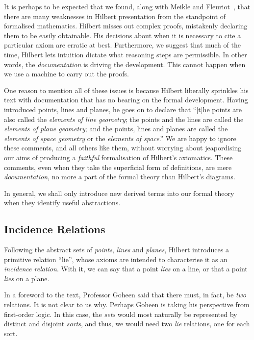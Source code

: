 It is perhaps to be expected that we found, along with Meikle and Fleuriot~\cite{MeikleFleuriotFormalizingHilbert}, that there are many weaknesses in Hilbert presentation from the standpoint of formalised mathematics. Hilbert misses out complex proofs, mistakenly declaring them to be easily obtainable. His decisions about when it is necessary to cite a particular axiom are erratic at best. Furthermore, we suggest that much of the time, Hilbert lets intuition dictate what reasoning steps are permissible. In other words, the \emph{documentation} is driving the development. This cannot happen when we use a machine to carry out the proofs.

One reason to mention all of these issues is because Hilbert liberally sprinkles his text with documentation that has no bearing on the formal development. Having introduced points, lines and planes, he goes on to declare that ``[t]he points are also called the \emph{elements of line geometry}; the points and the lines are called the \emph{elements of plane geometry}; and the points, lines and planes are called the \emph{elements of space geometry} or the \emph{elements of space}.'' We are happy to ignore these comments, and all others like them, without worrying about jeapordising our aims of producing a \emph{faithful} formalisation of Hilbert's axiomatics. These comments, even when they take the superficial form of definitions, are mere \emph{documentation}, no more a part of the formal theory than Hilbert's diagrams. 

In general, we shall only introduce new derived terms into our formal theory when they identify useful abstractions.

\subsection{Incidence Relations}
Following the abstract sets of \emph{points}, \emph{lines} and \emph{planes}, Hilbert introduces a primitive  relation ``lie'', whose axioms are intended to characterise it as an \emph{incidence relation}. With it, we can say that a point \emph{lies} on a line, or that a point \emph{lies} on a plane. 

In a foreword to the text, Professor Goheen said that there must, in fact, be \emph{two} relations. It is not clear to us why. Perhaps Goheen is taking his perspective from first-order logic. In this case, the \emph{sets} would most naturally be represented by distinct and disjoint \emph{sorts}, and thus, we would need two \emph{lie} relations, one for each sort. 

